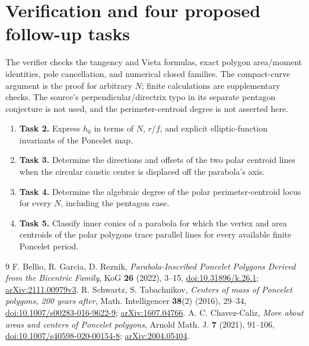 \documentclass[11pt]{article}
\begin{document}
\section*{Verification and four proposed follow-up tasks}
The verifier checks the tangency and Vieta formulas, exact polygon
area/moment identities, pole cancellation, and numerical closed
families. The compact-curve argument is the proof for arbitrary $N$;
finite calculations are supplementary checks. The source's
perpendicular/directrix typo in its separate pentagon conjecture is
not used, and the perimeter-centroid degree is not asserted here.
\begin{enumerate}
 \item \textbf{Task 2.} Express $h_0$ in terms of $N$, $r/f$,
 and explicit elliptic-function invariants of the Poncelet map.
 \item \textbf{Task 3.} Determine the directions and offsets of the
 two polar centroid lines when the circular caustic center is displaced
 off the parabola's axis.
 \item \textbf{Task 4.} Determine the algebraic degree of the polar
 perimeter-centroid locus for every $N$, including the pentagon case.
 \item \textbf{Task 5.} Classify inner conics of a parabola for which
 the vertex and area centroids of the polar polygons trace parallel
 lines for every available finite Poncelet period.
\end{enumerate}
\begin{thebibliography}{9}
 F. Bellio, R. Garcia, D. Reznik,
\emph{Parabola-Inscribed Poncelet Polygons Derived from the Bicentric Family},
KoG \textbf{26} (2022), 3--15,
\href{https://doi.org/10.31896/k.26.1}{doi:10.31896/k.26.1};
\href{https://arxiv.org/abs/2111.00979}{arXiv:2111.00979v3}.
 R. Schwartz, S. Tabachnikov,
\emph{Centers of mass of Poncelet polygons, 200 years after},
Math. Intelligencer \textbf{38}(2) (2016), 29--34,
\href{https://doi.org/10.1007/s00283-016-9622-9}{doi:10.1007/s00283-016-9622-9};
\href{https://arxiv.org/abs/1607.04766}{arXiv:1607.04766}.
 A. C. Chavez-Caliz,
\emph{More about areas and centers of Poncelet polygons},
Arnold Math. J. \textbf{7} (2021), 91--106,
\href{https://doi.org/10.1007/s40598-020-00154-8}{doi:10.1007/s40598-020-00154-8};
\href{https://arxiv.org/abs/2004.05404}{arXiv:2004.05404}.
\end{thebibliography}
\end{document}
